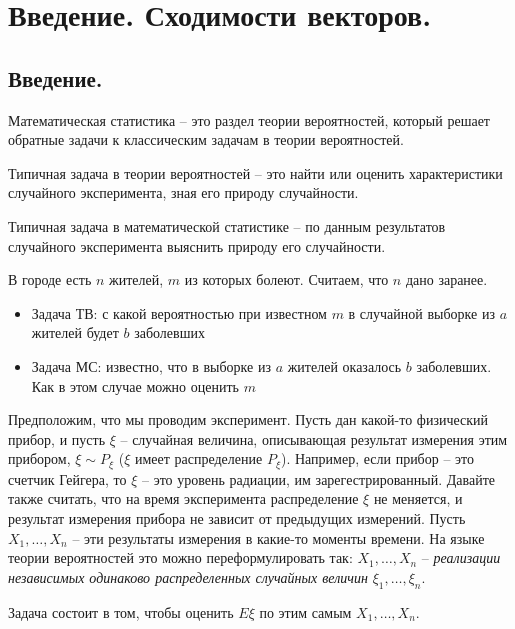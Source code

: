 \documentclass[document.tex]{subfiles}
\begin{document}
\section{Введение. Сходимости векторов.}

\subsection{Введение.}

Математическая статистика -- это раздел теории вероятностей, который решает обратные задачи к классическим задачам в теории вероятностей.

Типичная задача в теории вероятностей -- это найти или оценить характеристики случайного эксперимента, зная его природу случайности.

Типичная задача в математической статистике -- по данным результатов случайного эксперимента выяснить природу его случайности.

\begin{example}
	В городе есть $n$ жителей, $m$ из которых болеют. Считаем, что $n$ дано заранее.
	\begin{itemize}
		\item Задача ТВ: с какой вероятностью при известном $m$ в случайной выборке из $a$ жителей будет $b$ заболевших
		\item Задача МС: известно, что в выборке из $a$ жителей оказалось $b$ заболевших. Как в этом случае можно оценить $m$
	\end{itemize}
\end{example}

\begin{example}[Выборка]
	Предположим, что мы проводим эксперимент. Пусть дан какой-то физический прибор, и пусть $\xi$ -- случайная величина, описывающая результат измерения этим прибором, $\xi \sim P_{\xi}$ ($\xi$ имеет распределение $P_{\xi}$). Например, если прибор -- это счетчик Гейгера, то $\xi$ -- это уровень радиации, им зарегестрированный. Давайте также считать, что на время эксперимента распределение $\xi$ не меняется, и результат измерения прибора не зависит от предыдущих измерений.  Пусть $X_1, \dots, X_n$ -- эти результаты измерения в какие-то моменты времени. На языке теории вероятностей это можно переформулировать так: $X_1, \dots, X_n$ -- \textit{реализации независимых одинаково распределенных случайных величин} $\xi_1, \dots, \xi_n$. 

	Задача состоит в том, чтобы оценить $E\xi$ по этим самым $X_1, \dots, X_n$.
\end{example}
\end{document}

